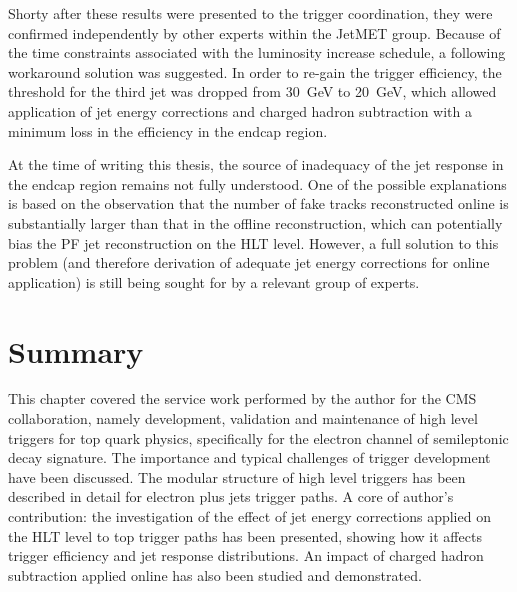 Shorty after these results were presented to the trigger coordination, they were confirmed independently by other
experts within the JetMET group. Because of the time constraints associated with the luminosity increase schedule, a
following workaround solution was suggested. In order to re-gain the trigger efficiency, the threshold for the third jet
was dropped from \SI{30}{\GeV} to \SI{20}{\GeV}, which allowed application of jet energy corrections and charged hadron
subtraction with a minimum loss in the efficiency in the endcap region.

At the time of writing this thesis, the source of inadequacy of the jet response in the endcap region remains not fully
understood. One of the possible explanations is based on the observation that the number of fake tracks reconstructed
online is substantially larger than that in the offline reconstruction, which can potentially bias the PF jet
reconstruction on the HLT level. However, a full solution to this problem (and therefore derivation of adequate jet
energy corrections for online application) is still being sought for by a relevant group of experts.

\newpage
\section{Summary}
This chapter covered the service work performed by the author for the CMS collaboration, namely development, validation
and maintenance of high level triggers for top quark physics, specifically for the electron channel of semileptonic
\ttbar decay signature. The importance and typical challenges of trigger development have been discussed. The modular
structure of high level triggers has been described in detail for electron plus jets trigger paths. A core of author's
contribution: the investigation of the effect of jet energy corrections applied on the HLT level to top trigger paths
has been presented, showing how it affects trigger efficiency and jet response distributions. An impact of charged
hadron subtraction applied online has also been studied and demonstrated.



